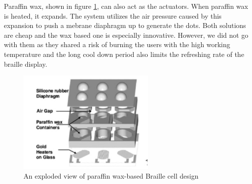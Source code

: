 Paraffin wax, shown in figure \ref{fig:paraffin}, can also act as the actuators. When paraffin wax is heated, it expands. The system utilizes the air pressure caused by this expansion to push a mebrane diaphragm up to generate the dots. Both solutions are cheap and the wax based one is especially innovative. However, we did not go with them as they shared a risk of burning the users with the high working temperature and the long cool down period also limits the refreshing rate of the braille display.
\begin{figure} \centering
    \includegraphics[width=0.6\textwidth]{figures/paraffin.png}
\caption{An exploded view of paraffin wax-based Braille cell design}
\label{fig:paraffin}
\end{figure}
